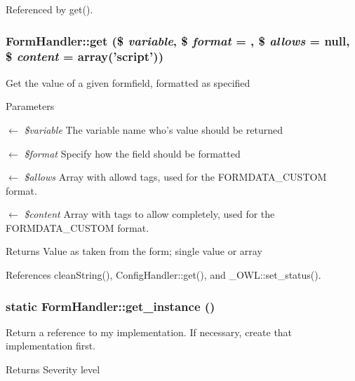 Referenced by get().

\subsubsection[{get}]{\setlength{\rightskip}{0pt plus 5cm}FormHandler::get (\$ {\em variable}, \/  \$ {\em format} = {}, \/  \$ {\em allows} = {\ttfamily null}, \/  \$ {\em content} = {\ttfamily array('script')})}\label{classFormHandler_a4dbeaa44aa51a795b16379ae703d893a}
Get the value of a given formfield, formatted as specified


\begin{DoxyParams}{Parameters}
\item[\mbox{$\leftarrow$} {\em \$variable}]The variable name who's value should be returned \item[\mbox{$\leftarrow$} {\em \$format}]Specify how the field should be formatted \item[\mbox{$\leftarrow$} {\em \$allows}]Array with allowd tags, used for the FORMDATA\_\-CUSTOM format. \item[\mbox{$\leftarrow$} {\em \$content}]Array with tags to allow completely, used for the FORMDATA\_\-CUSTOM format. \end{DoxyParams}
\begin{DoxyReturn}{Returns}
Value as taken from the form; single value or array 
\end{DoxyReturn}


References cleanString(), ConfigHandler::get(), and \_\-OWL::set\_\-status().

\subsubsection[{get\_\-instance}]{\setlength{\rightskip}{0pt plus 5cm}static FormHandler::get\_\-instance ()}\label{classFormHandler_ad5b352905583faed17034459f1a9ea6c}
Return a reference to my implementation. If necessary, create that implementation first.

\begin{DoxyReturn}{Returns}
Severity level 
\end{DoxyReturn}



